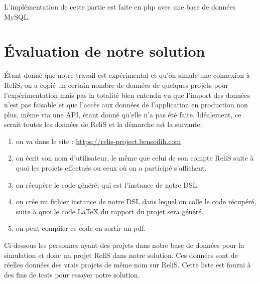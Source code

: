 L'implémentation de cette partie est faite en php avec une base de données MySQL.

\newpage

\section{Évaluation de notre solution}

Étant donné que notre travail est expérimental et qu'on simule une connexion à ReliS, on a copié un certain nombre de données de quelques projets pour l'expérimentation mais pas la totalité bien entendu vu que l'import des données n'est pas faisable et que l'accès aux données de l'application en production non plus, même via une API, étant donné qu'elle n'a pas été faite. Idéalement, ce serait toutes les données de ReliS et la démarche est la suivante:

\begin{enumerate}
    \item on va dans le site : \href{https://relis-project.bensoilih.com}{https://relis-project.bensoilih.com}
    \item on écrit son nom d'utilisateur, le même que celui de son compte ReliS suite à quoi les projets effectués ou ceux où on a participé s'affichent.
    \item on récupère le code généré, qui est l'instance de notre DSL.
    \item on crée un fichier instance de notre DSL dans lequel on colle le code récupéré, suite à quoi le code \LaTeX{} du rapport du projet sera généré.
    \item on peut compiler ce code en sortir un pdf.
\end{enumerate}

\newpage
Ci-dessous les personnes ayant des projets dans notre base de données pour la simulation et donc un projet ReliS dans notre solution. Ces données sont de réelles données des vrais projets de même nom sur ReliS.
Cette liste est fourni  à des fins de tests pour essayer notre solution.

